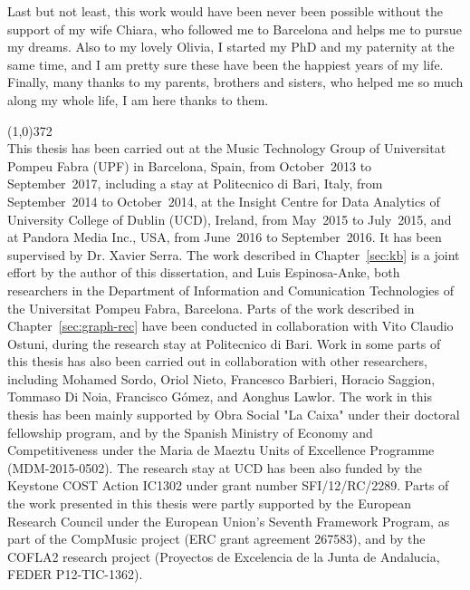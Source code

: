 Last but not least, this work would have been never been possible without the support of my wife Chiara, who followed me to Barcelona and helps me to pursue my dreams. Also to my lovely Olivia, I started my PhD and my paternity at the same time, and I am pretty sure these have been the happiest years of my life. Finally, many thanks to my parents, brothers and sisters, who helped me so much along my whole life, I am here thanks to them.

\vspace*{\fill}

\line(1,0){372}\\
\footnotesize
This thesis has been carried out at the Music Technology Group of Universitat Pompeu Fabra (UPF) in Barcelona, Spain, from October~2013 to September~2017, including a stay at Politecnico di Bari, Italy, from September~2014 to October~2014, at the Insight Centre for Data Analytics of University College of Dublin (UCD), Ireland, from May~2015 to July~2015, and at Pandora Media Inc., USA, from June~2016 to September~2016. It has been supervised by Dr. Xavier Serra.
The work described in Chapter~\ref{sec:kb} is a joint effort by the author of this dissertation, and Luis Espinosa-Anke, both researchers in the Department of Information and Comunication Technologies of the Universitat Pompeu Fabra, Barcelona. 
Parts of the work described in Chapter~\ref{sec:graph-rec} have been conducted in collaboration with Vito Claudio Ostuni, during the research stay at Politecnico di Bari. 
Work in some parts of this thesis has also been carried out in collaboration with other researchers, including Mohamed Sordo, Oriol Nieto, Francesco Barbieri, Horacio Saggion, Tommaso Di Noia, Francisco Gómez, and Aonghus Lawlor. 
The work in this thesis has been mainly supported by Obra Social "La Caixa" under their doctoral fellowship program, and by the Spanish Ministry of Economy and Competitiveness under the Maria de Maeztu Units of Excellence Programme (MDM-2015-0502). The research stay at UCD has been also funded by the Keystone COST Action IC1302 under grant number SFI/12/RC/2289. Parts of the work presented in this thesis were partly supported by the European Research Council under the European Union's Seventh Framework Program, as part of the CompMusic project (ERC grant agreement 267583), and by the COFLA2 research project (Proyectos de Excelencia de la Junta de Andalucia, FEDER P12-TIC-1362).
\normalsize
